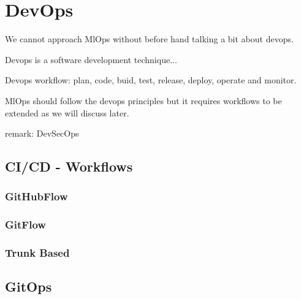 \section{DevOps}\label{sec:devops}
We cannot approach MlOps without before hand talking a bit about devops.

Devops is a software development technique...

Devops workflow: plan, code, buid, test, release, deploy, operate and monitor.

MlOps should follow the devops principles but it requires workflows to be extended as we will discuss later.

remark: DevSecOps

\subsection{CI/CD - Workflows}

\subsubsection{GitHubFlow}

\subsubsection{GitFlow}

\subsubsection{Trunk Based}

\subsection{GitOps}